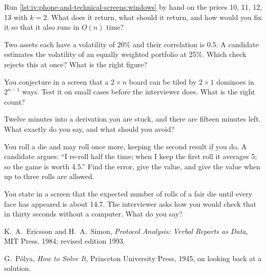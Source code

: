 \begin{interviewq}\label{iq:iv:phone-and-technical-screens:3}
Run \cref{lst:iv:phone-and-technical-screens:windows} by hand on the prices 10, 11, 12, 13 with $k = 2$. What
does it return, what should it return, and how would you fix it so that it also runs in $O(n)$ time?
\end{interviewq}

\begin{interviewq}\label{iq:iv:phone-and-technical-screens:4}
Two assets each have a volatility of 20\% and their correlation is 0.5. A candidate estimates the volatility
of an equally weighted portfolio at 25\%. Which check rejects this at once? What is the right figure?
\end{interviewq}

\begin{interviewq}\label{iq:iv:phone-and-technical-screens:5}
You conjecture in a screen that a $2 \times n$ board can be tiled by $2 \times 1$ dominoes in $2^{n-1}$ ways.
Test it on small cases before the interviewer does. What is the right count?
\end{interviewq}

\begin{interviewq}\label{iq:iv:phone-and-technical-screens:6}
Twelve minutes into a derivation you are stuck, and there are fifteen minutes left. What exactly do you say,
and what should you avoid?
\end{interviewq}

\begin{interviewq}\label{iq:iv:phone-and-technical-screens:7}
You roll a die and may roll once more, keeping the second result if you do. A candidate argues: ``I re-roll
half the time; when I keep the first roll it averages 5; so the game is worth 4.5.'' Find the error, give the
value, and give the value when up to three rolls are allowed.
\end{interviewq}

\begin{interviewq}\label{iq:iv:phone-and-technical-screens:8}
You state in a screen that the expected number of rolls of a fair die until every face has appeared is about
14.7. The interviewer asks how you would check that in thirty seconds without a computer. What do you say?
\end{interviewq}

\begin{omsources}
\item K.~A.~Ericsson and H.~A.~Simon, \emph{Protocol Analysis: Verbal Reports as Data}, MIT Press, 1984;
revised edition 1993.
\item G.~P\'olya, \emph{How to Solve It}, Princeton University Press, 1945, on looking back at a solution.
\end{omsources}
